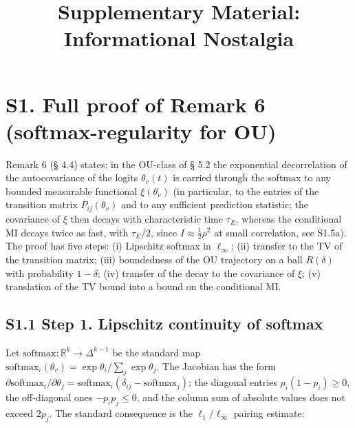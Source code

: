 \documentclass[pdflatex,sn-mathphys-ay]{sn-jnl}
\begin{document}
\title[Supplementary Material]{Supplementary Material: Informational Nostalgia}

\author*[1]{ }


\maketitle

\section*{S1. Full proof of Remark 6 (softmax-regularity for OU)}\label{s1.-full-proof-of-remark-6-softmax-regularity-for-ou}



Remark 6 (§ 4.4) states: in the OU-class of § 5.2 the exponential decorrelation of the autocovariance of the logits \(\theta_v(t)\) is carried through the softmax to any bounded measurable functional \(\xi(\theta_v)\) (in particular, to the entries of the transition matrix \(P_{ij}(\theta_v)\) and to any sufficient prediction statistic; the covariance of \(\xi\) then decays with characteristic time \(\tau_E\), whereas the conditional MI decays twice as fast, with \(\tau_E/2\), since \(I \approx \tfrac{1}{2}\rho^2\) at small correlation, see S1.5a). The proof has five steps: (i) Lipschitz softmax in \(\ell_\infty\); (ii) transfer to the TV of the transition matrix; (iii) boundedness of the OU trajectory on a ball \(R(\delta)\) with probability \(1-\delta\); (iv) transfer of the decay to the covariance of \(\xi\); (v) translation of the TV bound into a bound on the conditional MI.



\subsection*{S1.1 Step 1. Lipschitz continuity of softmax}\label{s1.1-step-1.-lipschitz-continuity-of-softmax}



Let \(\text{softmax}: \mathbb{R}^k \to \Delta^{k-1}\) be the standard map \(\text{softmax}_i(\theta_v) = \exp\theta_i / \sum_j \exp\theta_j\). The Jacobian has the form \(\partial \text{softmax}_i / \partial \theta_j = \text{softmax}_i(\delta_{ij} - \text{softmax}_j)\); the diagonal entries \(p_i(1-p_i) \ge 0\), the off-diagonal ones \(-p_i p_j \le 0\), and the column sum of absolute values does not exceed \(2 p_j\). The standard consequence is the \(\ell_1 / \ell_\infty\) pairing estimate:
\end{document}
